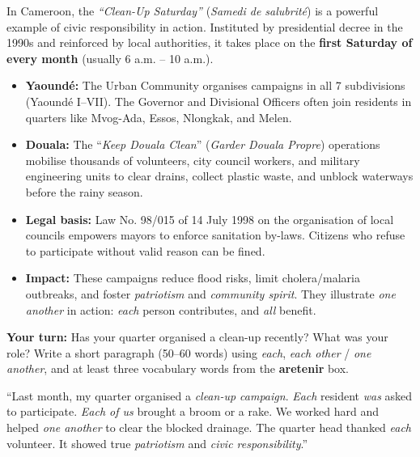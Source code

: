 \documentclass[11pt]{article}
\newcommand{\cle}[1]{{\popxbold\color{popdark}#1}}
\begin{document}
\begin{savaistu}
In Cameroon, the \emph{``Clean-Up Saturday''} (\emph{Samedi de salubrité}) is a powerful example of \cle{civic responsibility} in action. Instituted by presidential decree in the 1990s and reinforced by local authorities, it takes place on the \textbf{first Saturday of every month} (usually 6 a.m. -- 10 a.m.).
\begin{itemize}
\item \textbf{Yaoundé:} The Urban Community organises campaigns in all 7 subdivisions (Yaoundé I--VII). The Governor and Divisional Officers often join residents in quarters like Mvog-Ada, Essos, Nlongkak, and Melen.
\item \textbf{Douala:} The ``\emph{Keep Douala Clean}'' (\emph{Garder Douala Propre}) operations mobilise thousands of volunteers, city council workers, and military engineering units to clear drains, collect plastic waste, and unblock waterways before the rainy season.
\item \textbf{Legal basis:} Law No. 98/015 of 14 July 1998 on the organisation of local councils empowers mayors to enforce sanitation by-laws. Citizens who refuse to participate without valid reason can be fined.
\item \textbf{Impact:} These campaigns reduce flood risks, limit cholera/malaria outbreaks, and foster \emph{patriotism} and \emph{community spirit}. They illustrate \emph{one another} in action: \emph{each} person contributes, and \emph{all} benefit.
\end{itemize}
\textbf{Your turn:} Has your quarter organised a clean-up recently? What was your role? Write a short paragraph (50--60 words) using \emph{each}, \emph{each other} / \emph{one another}, and at least three vocabulary words from the \textbf{aretenir} box.
\end{savaistu}

\begin{exemplebox}
``Last month, my quarter organised a \emph{clean-up campaign}. \emph{Each} resident \emph{was} asked to participate. \emph{Each of us} brought a broom or a rake. We worked hard and helped \emph{one another} to clear the blocked drainage. The quarter head thanked \emph{each} volunteer. It showed true \emph{patriotism} and \emph{civic responsibility}.''
\end{exemplebox}
\end{document}
